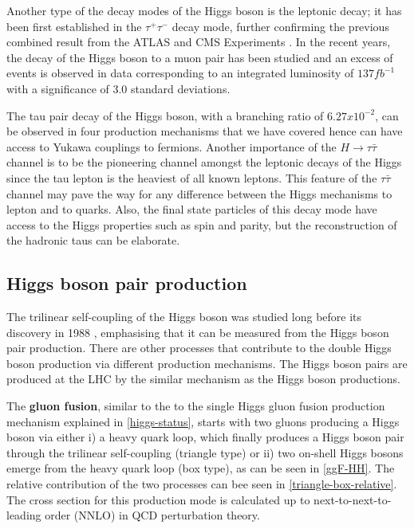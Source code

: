 Another type of the decay modes of the Higgs boson is the leptonic decay; it has been first established in the $\tau^+\tau^-$ decay mode\cite{CMS-PAS-HIG-16-043}, further confirming the previous combined result from the ATLAS and CMS Experiments \cite{Aad2016}. In the recent years, the decay of the Higgs boson to a muon pair has been studied and an excess of events is observed in data corresponding to an integrated luminosity of $137 fb^{-1}$ with a significance of 3.0 standard deviations\cite{CMS-PAS-HIG-19-006}.

The tau pair decay of the Higgs boson, with a branching ratio of $6.27x10^{-2}$, can be observed in four production mechanisms that we have covered hence can have access to Yukawa couplings to fermions. Another importance of the $H\rightarrow\tau\bar\tau$ channel is to be the pioneering channel amongst the leptonic decays of the Higgs since the tau lepton is the heaviest of all known leptons. This feature of the $\tau\bar\tau$ channel may pave the way for any difference between the Higgs mechanisms to lepton and to quarks. Also, the final state particles of this decay mode have access to the Higgs properties such as spin and parity, but the reconstruction of the hadronic taus can be elaborate. 

\subsection{Higgs boson pair production}

The trilinear self-coupling of the Higgs boson was studied long before its discovery in 1988 \cite{GLOVER1988282}, emphasising that it can be measured from the Higgs boson pair production. There are other processes that contribute to the double Higgs boson production via different production mechanisms. The Higgs boson pairs are produced at the LHC by the similar mechanism as the Higgs boson productions. 

The \textbf{gluon fusion}, similar to the to the single Higgs gluon fusion production mechanism explained in \autoref{higgs-status}, starts with two gluons producing a Higgs boson via either i) a heavy quark loop, which finally produces a Higgs boson pair through the trilinear self-coupling (triangle type) or ii) two on-shell Higgs bosons emerge from the heavy quark loop (box type), as can be seen in \autoref{ggF-HH}. The relative contribution of the two processes can bee seen in \autoref{triangle-box-relative}. The cross section for this production mode is calculated up to next-to-next-to-leading order (NNLO) in QCD perturbation theory\cite{deFlorian2016}.

